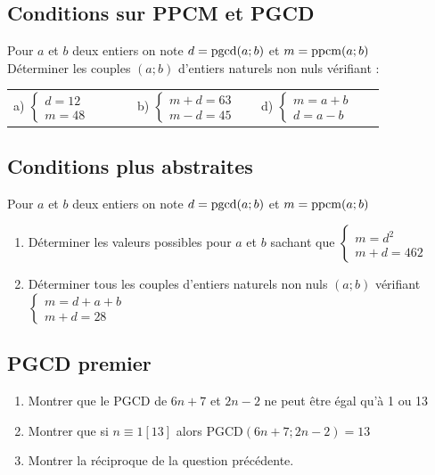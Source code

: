 \documentclass[oneside,12pt]{book}          %
\begin{document}
\subsection{Conditions sur PPCM et PGCD}
Pour $a$ et $b$ deux entiers on note $d={\mathrm{pgcd}}(a;b)$ et $m={\mathrm{ppcm}}(a;b)$\\
Déterminer les couples $(a;b)$ d'entiers naturels non nuls vérifiant :

\begin{tabular}{p{0.3\linewidth}p{0.3\linewidth}p{0.3\linewidth}}
    a) $\begin{cases}d=12\\m=48\end{cases}$ & b) $\begin{cases}m+d=63\\m-d=45\end{cases}$ & d) $\begin{cases}m=a+b\\d=a-b\end{cases}$
\end{tabular}



\subsection{Conditions plus abstraites}
Pour $a$ et $b$ deux entiers on note $d={\mathrm{pgcd}}(a;b)$ et $m={\mathrm{ppcm}}(a;b)$
\begin{enumerate}
    \item Déterminer les valeurs possibles pour $a$ et $b$ sachant que $\begin{cases}m=d^2\\m+d=462\end{cases}$
    \item Déterminer tous les couples d'entiers naturels non nuls $(a;b)$ vérifiant $\begin{cases}
        m=d+a+b \\ m+d=28
    \end{cases}$
\end{enumerate}



\subsection{PGCD premier}
\begin{enumerate}
    \item Montrer que le PGCD de $6n+7$ et $2n-2$ ne peut être égal qu'à 1 ou 13
    \item Montrer que si $n\equiv1[13]$ alors $\mathrm{PGCD}(6n+7;2n-2)=13$
	\item Montrer la réciproque de la question précédente.
\end{enumerate}
\end{document}

